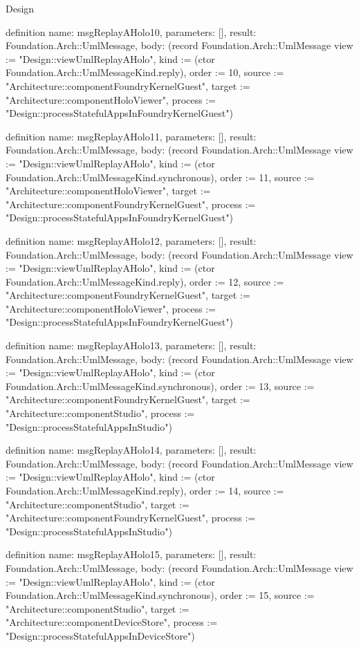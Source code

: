 \begin{lexlean}{Design}
\begin{semanticmodule}
definition{
  name: msgReplayAHolo10,
  parameters: [],
  result: Foundation.Arch::UmlMessage,
  body: (record Foundation.Arch::UmlMessage {view := "Design::viewUmlReplayAHolo", kind := (ctor Foundation.Arch::UmlMessageKind.reply), order := 10, source := "Architecture::componentFoundryKernelGuest", target := "Architecture::componentHoloViewer", process := "Design::processStatefulAppsInFoundryKernelGuest"})
}

definition{
  name: msgReplayAHolo11,
  parameters: [],
  result: Foundation.Arch::UmlMessage,
  body: (record Foundation.Arch::UmlMessage {view := "Design::viewUmlReplayAHolo", kind := (ctor Foundation.Arch::UmlMessageKind.synchronous), order := 11, source := "Architecture::componentHoloViewer", target := "Architecture::componentFoundryKernelGuest", process := "Design::processStatefulAppsInFoundryKernelGuest"})
}

definition{
  name: msgReplayAHolo12,
  parameters: [],
  result: Foundation.Arch::UmlMessage,
  body: (record Foundation.Arch::UmlMessage {view := "Design::viewUmlReplayAHolo", kind := (ctor Foundation.Arch::UmlMessageKind.reply), order := 12, source := "Architecture::componentFoundryKernelGuest", target := "Architecture::componentHoloViewer", process := "Design::processStatefulAppsInFoundryKernelGuest"})
}

definition{
  name: msgReplayAHolo13,
  parameters: [],
  result: Foundation.Arch::UmlMessage,
  body: (record Foundation.Arch::UmlMessage {view := "Design::viewUmlReplayAHolo", kind := (ctor Foundation.Arch::UmlMessageKind.synchronous), order := 13, source := "Architecture::componentFoundryKernelGuest", target := "Architecture::componentStudio", process := "Design::processStatefulAppsInStudio"})
}

definition{
  name: msgReplayAHolo14,
  parameters: [],
  result: Foundation.Arch::UmlMessage,
  body: (record Foundation.Arch::UmlMessage {view := "Design::viewUmlReplayAHolo", kind := (ctor Foundation.Arch::UmlMessageKind.reply), order := 14, source := "Architecture::componentStudio", target := "Architecture::componentFoundryKernelGuest", process := "Design::processStatefulAppsInStudio"})
}

definition{
  name: msgReplayAHolo15,
  parameters: [],
  result: Foundation.Arch::UmlMessage,
  body: (record Foundation.Arch::UmlMessage {view := "Design::viewUmlReplayAHolo", kind := (ctor Foundation.Arch::UmlMessageKind.synchronous), order := 15, source := "Architecture::componentStudio", target := "Architecture::componentDeviceStore", process := "Design::processStatefulAppsInDeviceStore"})
}


\end{semanticmodule}
\end{lexlean}
